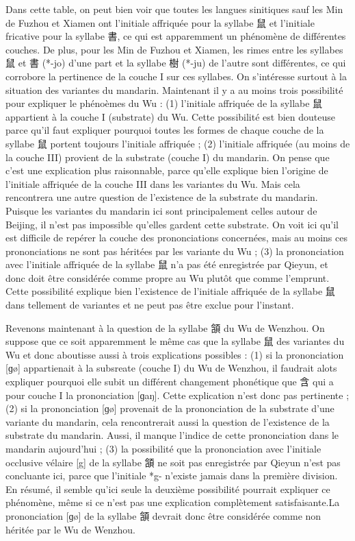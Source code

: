 \documentclass{scrbook}
\newcounter{c}[subsubsection]
\begin{document}
\begin{sloppypar}
Dans cette table, on peut bien voir que toutes les langues sinitiques sauf les Min de Fuzhou et Xiamen ont l'initiale affriquée pour la syllabe 鼠 et l'initiale fricative pour la syllabe 書, ce qui est apparemment un phénomène de différentes couches. De plus, pour les Min de Fuzhou et Xiamen, les rimes entre les syllabes 鼠 et 書 (*-jo) d'une part et la syllabe 樹 (*-ju) de l'autre sont différentes, ce qui corrobore la pertinence de la couche I sur ces syllabes. On s'intéresse surtout à la situation des variantes du mandarin. Maintenant il y a au moins trois possibilité pour expliquer le phénoèmes du Wu : (1) l'initiale affriquée de la syllabe 鼠 appartient à la couche I (substrate) du Wu. Cette possibilité est bien douteuse parce qu'il faut expliquer pourquoi toutes les formes de chaque couche de la syllabe 鼠 portent toujours l'initiale affriquée ; (2) l'initiale affriquée (au moins de la couche III) provient de la substrate (couche I) du mandarin. On pense que c'est une explication plus raisonnable, parce qu'elle explique bien l'origine de l'initiale affriquée de la couche III dans les variantes du Wu. Mais cela rencontrera une autre question de l'existence de la substrate du mandarin. Puisque les variantes du mandarin ici sont principalement celles autour de Beijing, il n'est pas impossible qu'elles gardent cette substrate. On voit ici qu'il est difficile de repérer la couche des prononciations concernées, mais au moins ces prononciations ne sont pas héritées par les variante du Wu ; (3) la prononciation avec l'initiale affriquée de la syllabe 鼠 n'a pas été enregistrée par Qieyun, et donc doit être considérée comme propre au Wu plutôt que comme l'emprunt. Cette possibilité explique bien l'existence de l'initiale affriquée de la syllabe 鼠 dans tellement de variantes et ne peut pas être exclue pour l'instant.

Revenons maintenant à la question de la syllabe 頷 du Wu de Wenzhou. On suppose que ce soit apparemment le même cas que la syllabe 鼠 des variantes du Wu et donc aboutisse aussi à trois explications possibles : (1) si la prononciation [ɡø] appartienait à la subsreate (couche I) du Wu de Wenzhou, il faudrait alots expliquer pourquoi elle subit un différent changement phonétique que 含 qui a pour couche I la prononciation [ɡaŋ]. Cette explication n'est donc pas pertinente ; (2) si la prononciation [ɡø] provenait de la prononciation de la substrate d'une variante du mandarin, cela rencontrerait aussi la question de l'existence de la substrate du mandarin. Aussi, il manque l'indice de cette prononciation dans le mandarin aujourd'hui ; (3) la possibilité que la prononciation avec l'initiale occlusive vélaire [g] de la syllabe 頷 ne soit pas enregistrée par Qieyun n'est pas concluante ici, parce que l'initiale *g- n'existe jamais dans la première division. En résumé, il semble qu'ici seule la deuxième possibilité pourrait expliquer ce phénomène, même si ce n'est pas une explication complètement satisfaisante.La prononciation [ɡø] de la syllabe 頷 devrait donc être considérée comme non héritée par le Wu de Wenzhou.


\end{sloppypar}
\end{document}
